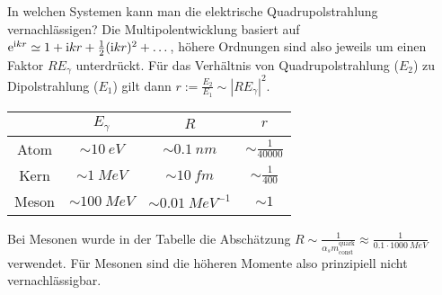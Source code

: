\begin{fquestion}{In welchen Systemen kann man die elektrische Quadrupolstrahlung vernachlässigen?}
    Die Multipolentwicklung basiert auf $\text{e}^{\text{i} kr} \simeq 1 + \text{i} kr + \frac{1}{2}(\text{i} kr)^2 + \dots$, höhere Ordnungen sind also jeweils um einen Faktor $RE_\gamma$ unterdrückt.
    Für das Verhältnis von Quadrupolstrahlung ($E_2$) zu Dipolstrahlung ($E_1$) gilt dann $r := \frac{E_2}{E_1} \sim |RE_\gamma|^2$.
    \begin{center}
        \begin{tabular}{c|c|c|c}
             & $E_\gamma$ & $R$ & $r$ \\ \hline
            Atom & $\sim \SI{10}{eV}$ & $\sim \SI{0.1}{nm}$ & $\sim \frac{1}{40000}$ \\ 
            Kern & $\sim \SI{1}{MeV}$ & $\sim \SI{10}{fm}$ & $\sim \frac{1}{400}$ \\ 
            Meson & $\sim \SI{100}{MeV}$ & $\sim \SI{0.01}{MeV^{-1}}$ & $\sim 1$ \\ 
        \end{tabular}
    \end{center}
    Bei Mesonen wurde in der Tabelle die Abschätzung $R\sim \frac{1}{\alpha_s m_\mathrm{const}^\mathrm{quark}} \approx \frac{1}{0.1 \cdot \SI{1000}{MeV}}$ verwendet.
    Für Mesonen sind die höheren Momente also prinzipiell nicht vernachlässigbar.
\end{fquestion}    

